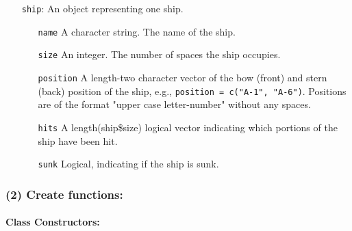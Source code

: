 \documentclass[
]{article}
\begin{document}
\begin{itemize}
\item[\texttt{ship}:] An object representing one ship.
  \begin{itemize}
    \item[\texttt{name}] A character string. The name of the ship.
    \item[\texttt{size}] An integer. The number of spaces the ship occupies.
    \item[\texttt{position}] A length-two character vector of the bow (front) and stern (back) position of the ship, e.g., \texttt{position = c("A-1", "A-6")}. Positions are of the format "upper case letter-number" without any spaces.
    \item[\texttt{hits}] A length(ship\$size) logical vector indicating which portions of the ship have been hit.
    \item[\texttt{sunk}] Logical, indicating if the ship is sunk.
  \end{itemize}
\end{itemize}

\subsubsection{(2) Create functions:}\label{create-functions}

\paragraph{Class Constructors:}\label{class-constructors}
\end{document}

